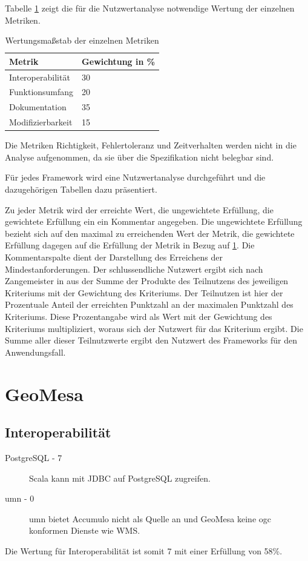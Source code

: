 Tabelle \ref{table:Wertungsmassstab} zeigt die für die Nutzwertanalyse notwendige Wertung der einzelnen Metriken.
\begin{table}[h]
\centering
\begin{tabular}{l|l}
\textbf{Metrik} & \textbf{Gewichtung in \%} \\ \hline
Interoperabilität & 30 \\ \hline
Funktionsumfang & 20 \\ \hline
Dokumentation & 35 \\ \hline
Modifizierbarkeit & 15
\end{tabular}
\caption{Wertungsmaßstab der einzelnen Metriken}
\label{table:Wertungsmassstab}
\end{table}
Die Metriken Richtigkeit, Fehlertoleranz und Zeitverhalten werden nicht in die Analyse aufgenommen, da sie über die Spezifikation nicht belegbar sind.

Für jedes Framework wird eine Nutzwertanalyse durchgeführt und die dazugehörigen Tabellen dazu präsentiert.

Zu jeder Metrik wird der erreichte Wert, die ungewichtete Erfüllung, die gewichtete Erfüllung ein ein Kommentar angegeben.
Die ungewichtete Erfüllung bezieht sich auf den maximal zu erreichenden Wert der Metrik, die gewichtete Erfüllung dagegen auf die Erfüllung der Metrik in Bezug auf \ref{table:Wertungsmassstab}.
Die Kommentarspalte dient der Darstellung des Erreichens der Mindestanforderungen.
Der schlussendliche Nutzwert ergibt sich nach Zangemeister in \cite{website:nutzwertanalyse} aus der Summe der Produkte des Teilnutzens des jeweiligen Kriteriums mit der Gewichtung des Kriteriums.
Der Teilnutzen ist hier der Prozentuale Anteil der erreichten Punktzahl an der maximalen Punktzahl des Kriteriums.
Diese Prozentangabe wird als Wert mit der Gewichtung des Kriteriums multipliziert, woraus sich der Nutzwert für das Kriterium ergibt.
Die Summe aller dieser Teilnutzwerte ergibt den Nutzwert des Frameworks für den Anwendungsfall.

\section{GeoMesa}

\subsection{Interoperabilität}
\begin{description}
\item[PostgreSQL - 7] Scala  kann mit JDBC auf PostgreSQL zugreifen.
\item[\Gls{umn} - 0] \Gls{umn} bietet Accumulo nicht als Quelle an und GeoMesa keine \Gls{ogc} konformen Dienste wie WMS.
\end{description}
Die Wertung für Interoperabilität ist somit 7 mit einer Erfüllung von 58\%.

